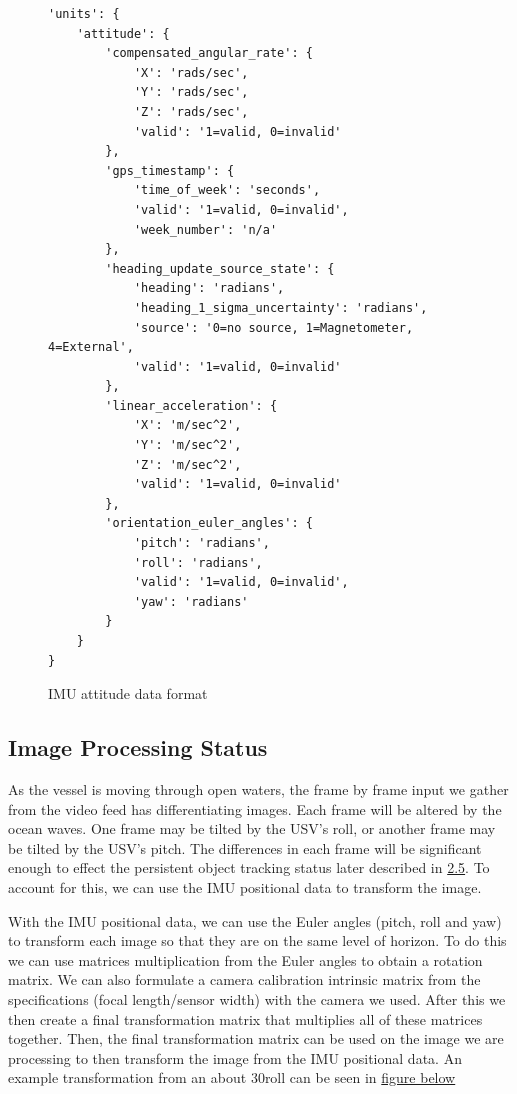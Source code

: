 \documentclass[onecolumn, draftclsnofoot,10pt, compsoc]{IEEEtran}
\begin{document}
\begin{figure}[H]
\begin{verbatim}
'units': {
    'attitude': { 
        'compensated_angular_rate': { 
            'X': 'rads/sec',
            'Y': 'rads/sec',
            'Z': 'rads/sec',
            'valid': '1=valid, 0=invalid'
        },
        'gps_timestamp': { 
            'time_of_week': 'seconds',
            'valid': '1=valid, 0=invalid',
            'week_number': 'n/a'
        },
        'heading_update_source_state': { 
            'heading': 'radians',
            'heading_1_sigma_uncertainty': 'radians',
            'source': '0=no source, 1=Magnetometer, 4=External',
            'valid': '1=valid, 0=invalid'
        },
        'linear_acceleration': { 
            'X': 'm/sec^2',
            'Y': 'm/sec^2',
            'Z': 'm/sec^2',
            'valid': '1=valid, 0=invalid'
        },
        'orientation_euler_angles': { 
            'pitch': 'radians',
            'roll': 'radians',
            'valid': '1=valid, 0=invalid',
            'yaw': 'radians'
        }
    }
}
\end{verbatim}
\caption{IMU attitude data format} 
\label{fig:IMUDataStruct}
\end{figure}

\subsection{Image Processing Status}

As the vessel is moving through open waters, the frame by frame input we gather from the video feed has differentiating images. Each frame will be altered by the ocean waves. One frame may be tilted by the USV's roll, or another frame may be tilted by the USV's pitch. The differences in each frame will be significant enough to effect the persistent object tracking status later described in \hyperref[sec:2.5]{2.5}. To account for this, we can use the IMU positional data to transform the image. 

With the IMU positional data, we can use the Euler angles (pitch, roll and yaw) to transform each image so that they are on the same level of horizon. To do this we can use matrices multiplication from the Euler angles to obtain a rotation matrix. We can also formulate a camera calibration intrinsic matrix from the specifications (focal length/sensor width) with the camera we used. After this we then create a final transformation matrix that multiplies all of these matrices together. Then, the final transformation matrix can  be used on the image we are processing to then transform the image from the IMU positional data. An example transformation from an about 30\textdegree  roll can be seen in \hyperref[fig:image-processing]{figure below}
\end{document}
